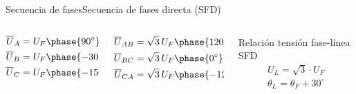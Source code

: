 \documentclass[aspectratio=169, xcolor={usenames,svgnames,dvipsnames}]{beamer}
\begin{document}
\begin{frame}{Secuencia de fases}{Secuencia de fases directa (SFD)}
\begin{columns}
\begin{column}{0.2\columnwidth}
\begin{align*}
  \overline{U}_A &= U_F\phase{{\ang{90}}}\\
  \overline{U}_B &= U_F\phase{\ang{-30}}\\
  \overline{U}_C &= U_F\phase{\ang{-150}}
\end{align*}
\end{column}
\begin{column}{0.2\columnwidth}
\begin{align*}
  \overline{U}_{AB} &= \sqrt{3}\,U_F\phase{\ang{120}}\\
  \overline{U}_{BC} &= \sqrt{3}\,U_F\phase{\ang{0}}\\
  \overline{U}_{CA} &= \sqrt{3}\,U_F\phase{\ang{-120}}
\end{align*}
\end{column}
\begin{column}{0.4\columnwidth}
\begin{block}{Relación tensión fase-línea SFD}
	\begin{equation*}
		\boxed{
			\begin{array}{l}
				U_L = \sqrt{3}\cdot U_F\\
				\theta_L = \theta_F + 30^\circ\\
			\end{array}
		} 
	\end{equation*}
\end{block}
\end{column}
\end{columns}
\end{frame}
\end{document}

